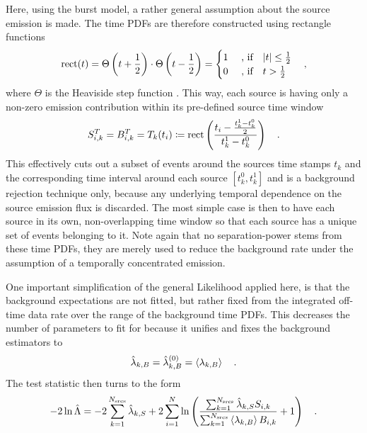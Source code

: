 Here, using the burst model, a rather general assumption about the source emission is made.
The time PDFs are therefore constructed using rectangle functions
\begin{equation}
  \operatorname{rect}(t)
  = \Theta\left(t+\frac{1}{2}\right) \cdot \Theta\left(t-\frac{1}{2}\right)
  = \begin{cases}
      1 &\text{ , if}\quad |t| \leq \frac{1}{2} \\
      0 &\text{ , if}\quad  t    >  \frac{1}{2} \\
    \end{cases}
  \quad\text{,}
\end{equation}
where $\Theta$ is the Heaviside step function .
This way, each source is having only a non-zero emission contribution within its pre-defined source time window
\begin{equation}
  S_{i,k}^T = B_{i,k}^T = T_k(t_i) \coloneqq
    \operatorname{rect}\left(\frac{t_i - \frac{t_k^1-t_k^0}{2}}
                              {t_k^1-t_k^0}\right)
  \quad\text{.}
\end{equation}
This effectively cuts out a subset of events around the sources time stamps $t_k$ and the corresponding time interval around each source $[t_k^0, t_k^1]$ and is a background rejection technique only, because any underlying temporal dependence on the source emission flux is discarded.
The most simple case is then to have each source in its own, non-overlapping time window so that each source has a unique set of events belonging to it.
Note again that no separation-power stems from these time PDFs, they are merely used to reduce the background rate under the assumption of a temporally concentrated emission.

One important simplification of the general Likelihood applied here, is that the background expectations are not fitted, but rather fixed from the integrated off-time data rate over the range of the background time PDFs.
This decreases the number of parameters to fit for because it unifies and fixes the background estimators to
\begin{equation}
  \hat{\lambda}_{k,B} = \hat{\lambda}_{k,B}^{(0)} = \Braket{\lambda_{k,B}}
  \quad\text{.}
\end{equation}
The test statistic then turns to the form
\begin{equation}
  -2\ln\hat{\Lambda}
  = -2\sum_{k=1}^{N_\text{srcs}}\hat{\lambda}_{k,S} +
      2\sum_{i=1}^N \ln\left(
        \frac{\sum_{k=1}^{N_\text{srcs}}\hat{\lambda}_{k,S} S_{i,k}}
             {\sum_{k=1}^{N_\text{srcs}}\Braket{\lambda_{k,B}} B_{i,k}}
        + 1
      \right)
  \quad\text{.}
\end{equation}

